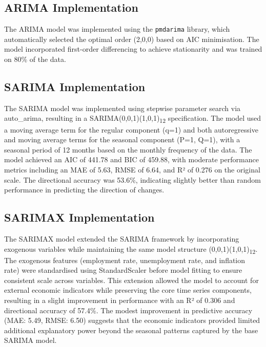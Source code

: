 \documentclass[12pt,a4paper]{report}
\begin{document}
\subsection{ARIMA Implementation}
\label{subsection:arima_implementation}
The ARIMA model was implemented using the \texttt{pmdarima} library, which automatically selected the optimal order (2,0,0) based on AIC minimisation. The model incorporated first-order differencing to achieve stationarity and was trained on 80\% of the data.

\subsection{SARIMA Implementation}
\label{subsection:sarima_implementation}
\sloppy
The SARIMA model was implemented using stepwise parameter search via auto\_arima, 
resulting in a SARIMA(0,0,1)(1,0,1)\textsubscript{12} specification. The model 
used a moving average term for the regular component (q=1) and both autoregressive 
and moving average terms for the seasonal component (P=1, Q=1), with a seasonal 
period of 12 months based on the monthly frequency of the data. The model achieved 
an AIC of 441.78 and BIC of 459.88, with moderate performance metrics including 
an MAE of 5.63, RMSE of 6.64, and R² of 0.276 on the original scale. The 
directional accuracy was 53.6\%, indicating slightly better than random 
performance in predicting the direction of changes.
\fussy

\subsection{SARIMAX Implementation}
\label{subsection:sarimax_implementation}
\sloppy
The SARIMAX model extended the SARIMA framework by incorporating exogenous 
variables while maintaining the same model structure (0,0,1)(1,0,1)\textsubscript{12}. 
The exogenous features (employment rate, unemployment rate, and inflation rate) were 
standardised using StandardScaler before model fitting to ensure consistent scale 
across variables. This extension allowed the model to account for external economic 
indicators while preserving the core time series components, resulting in a slight 
improvement in performance with an R² of 0.306 and directional accuracy of 57.4\%. 
The modest improvement in predictive accuracy (MAE: 5.49, RMSE: 6.50) suggests 
that the economic indicators provided limited additional explanatory power beyond 
the seasonal patterns captured by the base SARIMA model.
\fussy
\end{document}
